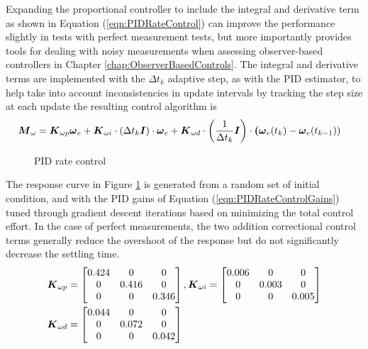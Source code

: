 Expanding the proportional controller to include the integral and derivative term as shown in Equation (\ref{eqn:PIDRateControl}) can improve the performance slightly in tests with perfect measurement tests, but more importantly provides tools for dealing with noisy measurements when assessing observer-based controllers in Chapter \ref{chap:ObserverBasedControls}.  The integral and derivative terms are implemented with the $\Delta t_k$ adaptive step, as with the PID estimator, to help take into account inconsistencies in update intervals by tracking the step size at each update the resulting control algorithm is
\begin{equation}
  \begin{aligned}
    \boldsymbol{M}_{\omega} &= \boldsymbol{K}_{\omega p} \boldsymbol{\omega}_e + \boldsymbol{K}_{\omega i} \cdot (\Delta t_k \boldsymbol{I})\cdot \boldsymbol{\omega}_e + \boldsymbol{K}_{\omega d} \cdot \left(\frac{1}{\Delta t_k} \boldsymbol{I}\right) \cdot \boldsymbol{(}\boldsymbol{\omega}_e(t_k) - \boldsymbol{\omega}_e(t_{k-1}))
  \end{aligned}
  \label{eqn:PIDRateControl}
\end{equation}
\begin{figure}[H]
  \centerline{}
  \caption{PID rate control}
  \label{fig:PIDRateControl}
\end{figure}
The response curve in Figure \ref{fig:PIDRateControl} is generated from a random set of initial condition, and with the PID gains of Equation (\ref{eqn:PIDRateControlGains}) tuned through gradient descent iterations based on minimizing the total control effort.  In the case of perfect measurements, the two addition correctional control terms generally reduce the overshoot of the response but do not significantly decrease the settling time.
\begin{equation}
  \begin{aligned}
    \boldsymbol{K}_{\omega p} &= \begin{bmatrix} 0.424 & 0 & 0 \\ 0 & 0.416 & 0 \\ 0 & 0 & 0.346 \end{bmatrix},
    \boldsymbol{K}_{\omega i} = \begin{bmatrix} 0.006 & 0 & 0 \\ 0 & 0.003 & 0 \\ 0 & 0 & 0.005 \end{bmatrix} \\
    \boldsymbol{K}_{\omega d} &= \begin{bmatrix} 0.044 & 0 & 0 \\ 0 & 0.072 & 0 \\ 0 & 0 & 0.042 \end{bmatrix}
  \end{aligned}
  \label{eqn:PIDRateControlGains}
\end{equation}
